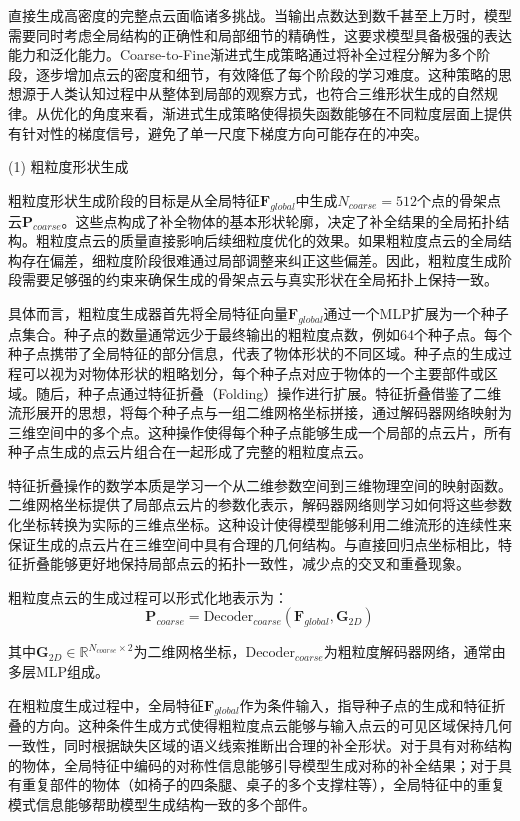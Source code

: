 直接生成高密度的完整点云面临诸多挑战。当输出点数达到数千甚至上万时，模型需要同时考虑全局结构的正确性和局部细节的精确性，这要求模型具备极强的表达能力和泛化能力。Coarse-to-Fine渐进式生成策略通过将补全过程分解为多个阶段，逐步增加点云的密度和细节，有效降低了每个阶段的学习难度。这种策略的思想源于人类认知过程中从整体到局部的观察方式，也符合三维形状生成的自然规律。从优化的角度来看，渐进式生成策略使得损失函数能够在不同粒度层面上提供有针对性的梯度信号，避免了单一尺度下梯度方向可能存在的冲突。

(1) 粗粒度形状生成

粗粒度形状生成阶段的目标是从全局特征$\mathbf{F}_{global}$中生成$N_{coarse}=512$个点的骨架点云$\mathbf{P}_{coarse}$。这些点构成了补全物体的基本形状轮廓，决定了补全结果的全局拓扑结构。粗粒度点云的质量直接影响后续细粒度优化的效果。如果粗粒度点云的全局结构存在偏差，细粒度阶段很难通过局部调整来纠正这些偏差。因此，粗粒度生成阶段需要足够强的约束来确保生成的骨架点云与真实形状在全局拓扑上保持一致。

具体而言，粗粒度生成器首先将全局特征向量$\mathbf{F}_{global}$通过一个MLP扩展为一个种子点集合。种子点的数量通常远少于最终输出的粗粒度点数，例如64个种子点。每个种子点携带了全局特征的部分信息，代表了物体形状的不同区域。种子点的生成过程可以视为对物体形状的粗略划分，每个种子点对应于物体的一个主要部件或区域。随后，种子点通过特征折叠（Folding）操作进行扩展。特征折叠借鉴了二维流形展开的思想，将每个种子点与一组二维网格坐标拼接，通过解码器网络映射为三维空间中的多个点。这种操作使得每个种子点能够生成一个局部的点云片，所有种子点生成的点云片组合在一起形成了完整的粗粒度点云。

特征折叠操作的数学本质是学习一个从二维参数空间到三维物理空间的映射函数。二维网格坐标提供了局部点云片的参数化表示，解码器网络则学习如何将这些参数化坐标转换为实际的三维点坐标。这种设计使得模型能够利用二维流形的连续性来保证生成的点云片在三维空间中具有合理的几何结构。与直接回归点坐标相比，特征折叠能够更好地保持局部点云的拓扑一致性，减少点的交叉和重叠现象。

粗粒度点云的生成过程可以形式化地表示为：
\begin{equation}
\mathbf{P}_{coarse} = \text{Decoder}_{coarse}(\mathbf{F}_{global}, \mathbf{G}_{2D})
\end{equation}

其中$\mathbf{G}_{2D} \in \mathbb{R}^{N_{coarse} \times 2}$为二维网格坐标，$\text{Decoder}_{coarse}$为粗粒度解码器网络，通常由多层MLP组成。

在粗粒度生成过程中，全局特征$\mathbf{F}_{global}$作为条件输入，指导种子点的生成和特征折叠的方向。这种条件生成方式使得粗粒度点云能够与输入点云的可见区域保持几何一致性，同时根据缺失区域的语义线索推断出合理的补全形状。对于具有对称结构的物体，全局特征中编码的对称性信息能够引导模型生成对称的补全结果；对于具有重复部件的物体（如椅子的四条腿、桌子的多个支撑柱等），全局特征中的重复模式信息能够帮助模型生成结构一致的多个部件。


